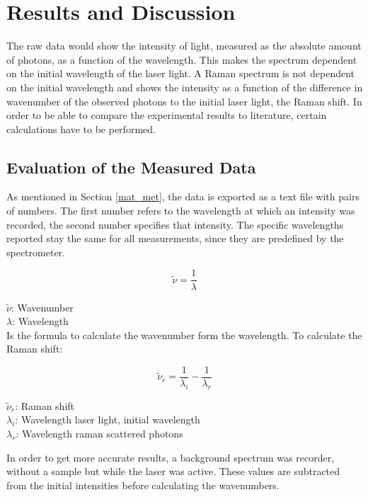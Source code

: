 \section{Results and Discussion}
The raw data would show the intensity of light, measured as the absolute amount of photons, as a function of the wavelength. This makes the spectrum dependent on the initial wavelength of the laser light. A Raman spectrum is not dependent on the initial wavelength and shows the intensity as a function of the difference in wavenumber of the observed photons to the initial laser light, the Raman shift. In order to be able to compare the experimental results to literature, certain calculations have to be performed.

\subsection{Evaluation of the Measured Data}

    As mentioned in Section \ref{mat_met}, the data is exported as a text file with pairs of numbers. The first number refers to the wavelength at which an intensity was recorded, the second number specifies that intensity. The specific wavelengths reported stay the same for all measurements, since they are predefined by the spectrometer.


    \begin{equation}
        \widetilde{\nu} = \frac{1}{\lambda}
    \end{equation}

    \(\widetilde{\nu}\): Wavenumber\\
    \(\lambda\): Wavelength\\

    Is the formula to calculate the wavenumber form the wavelength. To calculate the Raman shift:

    \begin{equation} \label{eq:1}
        \widetilde{\nu}_r = \frac{1}{\lambda_i} - \frac{1}{\lambda_r}
    \end{equation}

    \(\widetilde{\nu}_r\): Raman shift\\
    \(\lambda_i\): Wavelength laser light, initial wavelength\\
    \(\lambda_r\): Wavelength raman scattered photons

    \bigskip

    In order to get more accurate results, a background spectrum was recorder, without a sample but while the laser was active. These values are subtracted from the initial intensities before calculating the wavenumbers. 

